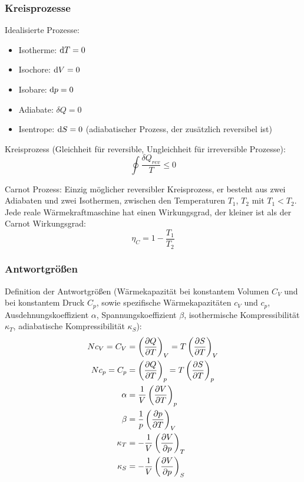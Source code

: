 \documentclass[11pt]{article}
\numberwithin{equation}{section}
\begin{document}
			\subsubsection{Kreisprozesse}
				\noindent
				Idealisierte Prozesse:
				\begin{itemize}
					\item Isotherme: $\mathrm{d} T = 0$
					\item Isochore: $\mathrm{d} V = 0$
					\item Isobare: $\mathrm{d} p = 0$
					\item Adiabate: $\delta Q = 0$
					\item Isentrope: $\mathrm{d} S = 0$ (adiabatischer Prozess, der zusätzlich reversibel ist)
				\end{itemize}

				\noindent
				Kreisprozess (Gleichheit für reversible, Ungleichheit für irreversible Prozesse):
				\begin{equation}
					\oint \frac{\delta Q_{rev}}{T} \le 0
				\end{equation}

				\noindent
				Carnot Prozess: Einzig möglicher reversibler Kreisprozess, er besteht aus zwei Adiabaten und zwei Isothermen, zwischen den Temperaturen $T_1$, $T_2$ mit $T_1 < T_2$. Jede reale Wärmekraftmaschine hat einen Wirkungsgrad, der kleiner ist als der Carnot Wirkungsgrad:
				\begin{equation}
					\eta_C = 1-\frac{T_1}{T_2}
				\end{equation}

			\subsubsection{Antwortgrößen}
				\noindent
				Definition der Antwortgrößen (Wärmekapazität bei konstantem Volumen $C_V$ und bei konstantem Druck $C_p$, sowie spezifische Wärmekapazitäten $c_V$ und $c_p$, Ausdehnungskoeffizient $\alpha$, Spannungskoeffizient $\beta$, isothermische Kompressibilität $\kappa_T$, adiabatische Kompressibilität $\kappa_S$):
				\begin{equation}
					\begin{aligned}
						N c_V = C_V &= \left( \frac{\partial Q}{\partial T} \right)_V = T \left( \frac{\partial S}{\partial T} \right)_V \\
						N c_p = C_p &= \left( \frac{\partial Q}{\partial T} \right)_p = T \left( \frac{\partial S}{\partial T} \right)_p \\
						\alpha &= \frac{1}{V} \left( \frac{\partial V}{\partial T} \right)_p \\
						\beta &= \frac{1}{p} \left( \frac{\partial p}{\partial T} \right)_V \\
						\kappa_T &= -\frac{1}{V} \left( \frac{\partial V}{\partial p} \right)_T \\
						\kappa_S &= -\frac{1}{V} \left( \frac{\partial V}{\partial p} \right)_S \\
					\end{aligned}
				\end{equation}
\end{document}
